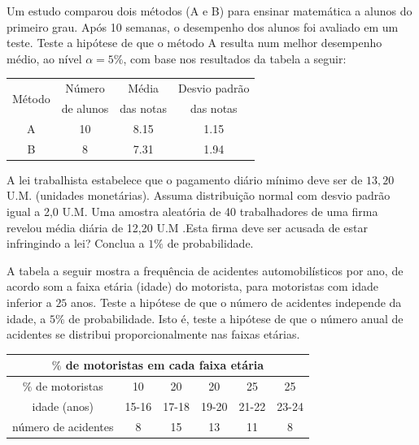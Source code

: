 \documentclass{report}
\begin{document}
\begin{Exercise}
\Question Um estudo comparou dois métodos (A e B) para ensinar matemática a alunos do primeiro grau. Após 10 semanas, o desempenho dos alunos foi 
avaliado em um teste. Teste a hipótese de que o método A resulta num melhor desempenho médio, ao nível $\alpha=5\%$, com base nos resultados da tabela a seguir:

\begin{table}[H]
\centering
\begin{tabular}{cccc}
\hline \hline
\multirow{2}{*}{Método}&Número   &Média      &Desvio padrão\\
                                       &de alunos&das notas&das notas        \\
\hline\hline
                                     A& 10           &8.15        &1.15                 \\
                                     B&   8           &7.31        &1.94                 \\
\hline \hline
\end{tabular}
\end{table}

\Question A lei trabalhista estabelece que o pagamento diário mínimo deve ser de $13,20$ U.M. (unidades monetárias). Assuma distribuição normal com desvio 
padrão igual a 2,0 U.M. Uma amostra aleatória de 40 trabalhadores de uma firma revelou média diária de 12,20 U.M .Esta firma deve ser acusada de estar 
infringindo a lei? Conclua a $1\%$ de probabilidade.

\Question A tabela a seguir mostra a frequência de acidentes automobilísticos por ano, de acordo som a faixa etária (idade) do motorista, para motoristas com 
idade inferior a $25$ anos. Teste a hipótese de que o número de acidentes independe da idade, a $5\%$ de probabilidade. Isto é, teste a hipótese de que o número 
anual de acidentes se distribui proporcionalmente nas faixas etárias.

\begin{table}[H]
\centering
\begin{tabular}{cccccc}
\hline \hline
\multicolumn{6}{c}{$\%$ de motoristas em cada faixa etária}\\
\hline\hline
$\%$ de motoristas& 10                &20              &20 & 25 & 25                 \\
idade (anos)            &15-16           &17-18        &19-20 & 21-22 & 23-24                 \\
\hline
número de acidentes &8 & 15 & 13 & 11 & 8 \\
\hline \hline
\end{tabular}
\end{table}


\end{Exercise}
\end{document}
